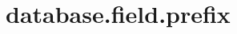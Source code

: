 \section{database.field.prefix}
\label{configuration:DatabaseFieldPrefix}
\AvailableInJavaOnly{\TODO}